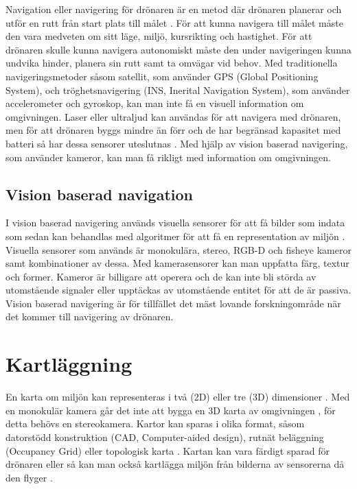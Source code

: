 Navigation eller navigering för drönaren är en metod där drönaren planerar och utför en rutt från start plats till målet \citep{geospatial}. För att kunna navigera till målet måste den vara medveten om sitt läge, miljö, kursrikting och hastighet. För att drönaren skulle kunna navigera autonomiskt måste den under navigeringen kunna undvika hinder, planera sin rutt samt ta omvägar vid behov. Med traditionella navigeringsmetoder såsom satellit, som använder GPS (Global Positioning System), och tröghetsnavigering (INS, Inerital Navigation System), som använder accelerometer och gyroskop, kan man inte få en visuell information om omgivningen. Laser eller ultraljud kan användas för att navigera med drönaren, men för att drönaren byggs mindre än förr och de har begränsad kapasitet med batteri så har dessa sensorer uteslutnas \citep{6385934}. Med hjälp av vision baserad navigering, som använder kameror, kan man få rikligt med information om omgivningen. 

\subsection{Vision baserad navigation}

I vision baserad navigering används visuella sensorer för att få bilder som indata som sedan kan behandlas med algoritmer för att få en representation av miljön \citep{geospatial}. Visuella sensorer som används är monokulära, stereo, RGB-D och fisheye kameror samt kombinationer av dessa. Med kamerasensorer kan man uppfatta färg, textur och former. Kameror är billigare att operera och de kan inte bli störda av utomstående signaler eller upptäckas av utomstående entitet för att de är passiva. Vision baserad navigering är för tillfället det mäst lovande forskningområde när det kommer till navigering av drönaren.

\section{Kartläggning}

En karta om miljön kan representeras i två (2D) eller tre (3D) dimensioner \citep{geospatial}. Med en monokulär kamera går det inte att bygga en 3D karta av omgivningen \citep{depthmap}, för detta behövs en stereokamera. Kartor kan sparas i olika format, såsom datorstödd konstruktion (CAD, Computer-aided design), rutnät beläggning (Occupancy Grid) eller topologisk karta \citep{982903}. Kartan kan vara färdigt sparad för drönaren eller så kan man också kartlägga miljön från bilderna av sensorerna då den flyger \citep{geospatial}. 

